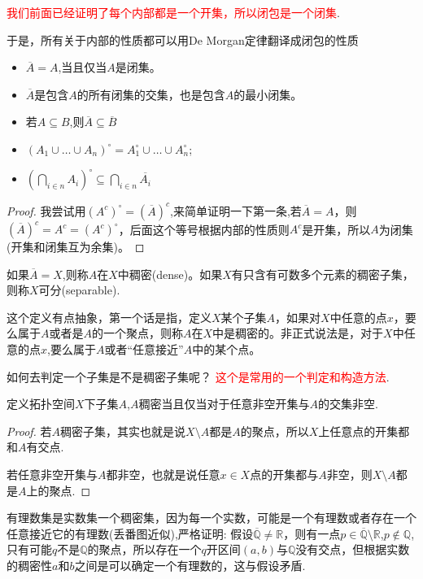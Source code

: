 \textcolor{red}{我们前面已经证明了每个内部都是一个开集，所以闭包是一个闭集}.

于是，所有关于内部的性质都可以用De Morgan定律翻译成闭包的性质

\begin{itemize}
	\item $\overline{A} = A$,当且仅当$A$是闭集。
	\item $\overline{A}$是包含$A$的所有闭集的交集，也是包含$A$的最小闭集。
	\item 若$A \subseteq B$,则$\overline{A} \subseteq \overline{B}$
	\item $(A_1 \cup \ldots \cup A_n)^{\circ}=A_1^{\circ} \cup \ldots \cup A_n^{\circ}$;
	\item ${\left(\bigcap\limits_{i \in n} A_i\right)}^{\circ} \subseteq \bigcap\limits_{i \in n} \overline{A_i}$
\end{itemize}

\begin{proof}
我尝试用$(A^{c})^{\circ}=(\overline{A})^c$,来简单证明一下第一条,若$\overline{A}=A$，则$(\overline{A})^c = A^c=(A^{c})^{\circ}$，后面这个等号根据内部的性质则$A^c$是开集，所以$A$为闭集(开集和闭集互为余集)。
\end{proof}


\begin{definition}
如果$\overline{A}=X$,则称$A$在$X$中稠密(dense)。如果$X$有只含有可数多个元素的稠密子集，则称$X$可分(separable).
\end{definition}

这个定义有点抽象，第一个话是指，定义$X$某个子集$A$，如果对$X$中任意的点$x$，要么属于$A$或者是$A$的一个聚点，则称$A$在$X$中是稠密的。非正式说法是，对于$X$中任意的点$x$,要么属于$A$或者“任意接近”$A$中的某个点。

如何去判定一个子集是不是稠密子集呢？ \textcolor{red}{这个是常用的一个判定和构造方法}.
\begin{proposition}
定义拓扑空间$X$下子集$A$,$A$稠密当且仅当对于任意非空开集与$A$的交集非空.
\end{proposition}

\begin{proof}
若$A$稠密子集，其实也就是说$X \setminus A$都是$A$的聚点，所以$X$上任意点的开集都和$A$有交点.

若任意非空开集与$A$都非空，也就是说任意$x \in X$点的开集都与$A$非空，则$X \setminus A$都是$A$上的聚点.
\end{proof}

\begin{example}
有理数集是实数集一个稠密集，因为每一个实数，可能是一个有理数或者存在一个任意接近它的有理数(丢番图近似),严格证明: 假设$\overline{\mathbb{Q}} \neq \mathbb{R}$，则有一点$p \in \overline{\mathbb{Q}} \setminus \mathbb{R}$,$p \notin \mathbb{Q}$,只有可能$q$不是$\mathbb{Q}$的聚点，所以存在一个$q$开区间$(a,b)$与$\mathbb{Q}$没有交点，但根据实数的稠密性$a$和$b$之间是可以确定一个有理数的，这与假设矛盾.
\end{example}

